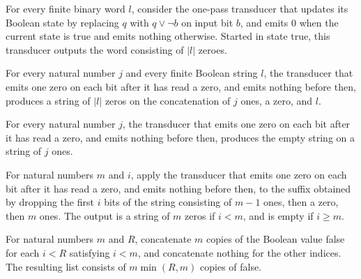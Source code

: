\begin{theorem}
\label{Randomized.transduce_seen}
\leanok
{}
For every finite binary word $l$, consider the one-pass transducer that updates its
Boolean state by replacing $q$ with $q\lor\neg b$ on input bit $b$, and emits $0$ when
the current state is true and emits nothing otherwise. Started in state true, this
transducer outputs the word consisting of $|l|$ zeroes.
\end{theorem}

\begin{theorem}
\label{Randomized.zerosAfterZero_ones_zero}
\leanok
{}
For every natural number $j$ and every finite Boolean string $l$, the transducer that
emits one zero on each bit after it has read a zero, and emits nothing before then,
produces a string of $|l|$ zeros on the concatenation of $j$ ones, a zero, and $l$.
\end{theorem}

\begin{theorem}
\label{Randomized.zerosAfterZero_ones}
\leanok
{}
For every natural number $j$, the transducer that emits one zero on each bit after it
has read a zero, and emits nothing before then, produces the empty string on a string of
$j$ ones.
\end{theorem}

\begin{theorem}
\label{Randomized.zerosAfterZero_drop}
\leanok
{}
For natural numbers $m$ and $i$, apply the transducer that emits one zero on each bit
after it has read a zero, and emits nothing before then, to the suffix obtained by
dropping the first $i$ bits of the string consisting of $m-1$ ones, then a zero, then
$m$ ones. The output is a string of $m$ zeros if $i<m$, and is empty if $i\ge m$.
\end{theorem}

\begin{theorem}
\label{Randomized.flatMap_range_ite}
\leanok
{}
For natural numbers $m$ and $R$, concatenate $m$ copies of the Boolean value false for
each $i<R$ satisfying $i<m$, and concatenate nothing for the other indices. The
resulting list consists of $m\min(R,m)$ copies of false.
\end{theorem}

